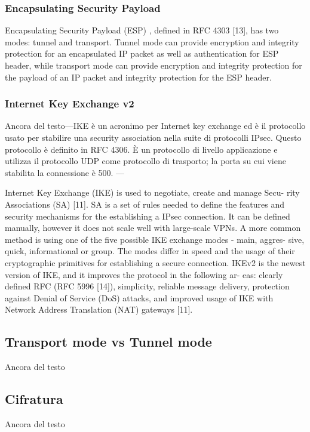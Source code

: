 \subsubsection{Encapsulating Security Payload}
Encapsulating Security Payload (ESP) , defined in RFC 4303 [13], has two modes: tunnel and transport. Tunnel mode can provide encryption and integrity protection for an encapsulated IP packet as well as authentication for ESP header, while transport mode can provide encryption and integrity protection for the payload of an IP packet and integrity protection for the ESP header.

\subsubsection{Internet Key Exchange v2}
Ancora del testo---IKE è un acronimo per Internet key exchange ed è il protocollo usato per stabilire una security association nella suite di protocolli IPsec. Questo protocollo è definito in RFC 4306. È un protocollo di livello applicazione e utilizza il protocollo UDP come protocollo di trasporto; la porta su cui viene stabilita la connessione è 500. ---

Internet Key Exchange (IKE) is used to negotiate, create and manage Secu- rity Associations (SA) [11]. SA is a set of rules needed to define the features and security mechanisms for the establishing a IPsec connection. It can be defined manually, however it does not scale well with large-scale VPNs. A more common method is using one of the five possible IKE exchange modes - main, aggres- sive, quick, informational or group. The modes differ in speed and the usage of their cryptographic primitives for establishing a secure connection. IKEv2 is the newest version of IKE, and it improves the protocol in the following ar- eas: clearly defined RFC (RFC 5996 [14]), simplicity, reliable message delivery, protection against Denial of Service (DoS) attacks, and improved usage of IKE with Network Address Translation (NAT) gateways [11].


\subsection{Transport mode vs Tunnel mode}
Ancora del testo

\subsection{Cifratura}
Ancora del testo


